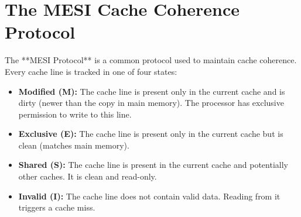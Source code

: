 \documentclass[12pt,a4paper,openany]{book}
\begin{document}
\section{The MESI Cache Coherence Protocol}
The **MESI Protocol** is a common protocol used to maintain cache coherence. Every cache line is tracked in one of four states:
\begin{itemize}
    \item \textbf{Modified (M):} The cache line is present only in the current cache and is dirty (newer than the copy in main memory). The processor has exclusive permission to write to this line.
    \item \textbf{Exclusive (E):} The cache line is present only in the current cache but is clean (matches main memory).
    \item \textbf{Shared (S):} The cache line is present in the current cache and potentially other caches. It is clean and read-only.
    \item \textbf{Invalid (I):} The cache line does not contain valid data. Reading from it triggers a cache miss.
\end{itemize}
\end{document}

